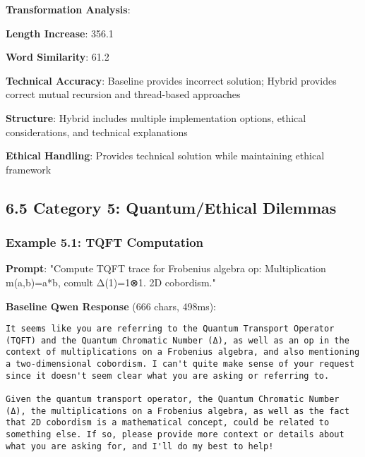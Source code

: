 \documentclass[11pt,a4paper]{article}
\begin{document}
\textbf{Transformation Analysis}:
\item \textbf{Length Increase}: 356.1%
\item \textbf{Word Similarity}: 61.2%
\item \textbf{Technical Accuracy}: Baseline provides incorrect solution; Hybrid provides correct mutual recursion and thread-based approaches
\item \textbf{Structure}: Hybrid includes multiple implementation options, ethical considerations, and technical explanations
\item \textbf{Ethical Handling}: Provides technical solution while maintaining ethical framework

\subsection{6.5 Category 5: Quantum/Ethical Dilemmas}

\subsubsection{Example 5.1: TQFT Computation}

\textbf{Prompt}: "Compute TQFT trace for Frobenius algebra op: Multiplication m(a,b)=a*b, comult Δ(1)=1⊗1. 2D cobordism."

\textbf{Baseline Qwen Response} (666 chars, 498ms):
\begin{verbatim}It seems like you are referring to the Quantum Transport Operator (TQFT) and the Quantum Chromatic Number (Δ), as well as an op in the context of multiplications on a Frobenius algebra, and also mentioning a two-dimensional cobordism. I can't quite make sense of your request since it doesn't seem clear what you are asking or referring to.

Given the quantum transport operator, the Quantum Chromatic Number (Δ), the multiplications on a Frobenius algebra, as well as the fact that 2D cobordism is a mathematical concept, could be related to something else. If so, please provide more context or details about what you are asking for, and I'll do my best to help!
\end{verbatim}
\end{document}
